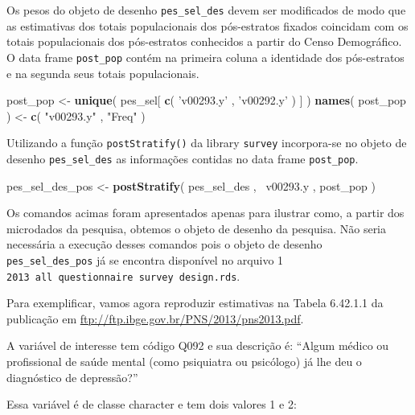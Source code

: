 \documentclass[]{book}
\newenvironment{Shaded}{\begin{snugshade}}{\end{snugshade}}
\newcommand{\KeywordTok}[1]{\textcolor[rgb]{0.13,0.29,0.53}{\textbf{{#1}}}}
\newcommand{\StringTok}[1]{\textcolor[rgb]{0.31,0.60,0.02}{{#1}}}
\newcommand{\NormalTok}[1]{{#1}}
\numberwithin{example}{chapter}
\numberwithin{remark}{chapter}
\numberwithin{definition}{chapter}
\begin{document}
Os pesos do objeto de desenho \texttt{pes\_sel\_des} devem ser
modificados de modo que as estimativas dos totais populacionais dos
pós-estratos fixados coincidam com os totais populacionais dos
pós-estratos conhecidos a partir do Censo Demográfico. O data frame
\texttt{post\_pop} contém na primeira coluna a identidade dos
pós-estratos e na segunda seus totais populacionais.

\begin{Shaded}
\begin{Highlighting}[]
\NormalTok{post_pop <-}\StringTok{ }\KeywordTok{unique}\NormalTok{( pes_sel[ }\KeywordTok{c}\NormalTok{( }\StringTok{'v00293.y'} \NormalTok{, }\StringTok{'v00292.y'} \NormalTok{) ] )}
\KeywordTok{names}\NormalTok{( post_pop ) <-}\StringTok{ }\KeywordTok{c}\NormalTok{( }\StringTok{"v00293.y"} \NormalTok{, }\StringTok{"Freq"} \NormalTok{)}
\end{Highlighting}
\end{Shaded}

Utilizando a função \texttt{postStratify()} da library \texttt{survey}
\citep{R-survey} incorpora-se no objeto de desenho
\texttt{pes\_sel\_des} as informações contidas no data frame
\texttt{post\_pop}.

\begin{Shaded}
\begin{Highlighting}[]
\NormalTok{pes_sel_des_pos <-}\StringTok{ }\KeywordTok{postStratify}\NormalTok{( pes_sel_des , ~v00293.y , post_pop )}
\end{Highlighting}
\end{Shaded}

Os comandos acimas foram apresentados apenas para ilustrar como, a
partir dos microdados da pesquisa, obtemos o objeto de desenho da
pesquisa. Não seria necessária a execução desses comandos pois o objeto
de desenho \texttt{pes\_sel\_des\_pos} já se encontra disponível no
arquivo 1 \texttt{2013\ all\ questionnaire\ survey\ design.rds}.

Para exemplificar, vamos agora reproduzir estimativas na Tabela 6.42.1.1
da publicação em \url{ftp://ftp.ibge.gov.br/PNS/2013/pns2013.pdf}.

A variável de interesse tem código Q092 e sua descrição é: ``Algum
médico ou profissional de saúde mental (como psiquiatra ou psicólogo) já
lhe deu o diagnóstico de depressão?''

Essa variável é de classe character e tem dois valores 1 e 2:

\begin{Shaded}
\end{Shaded}
\end{document}
